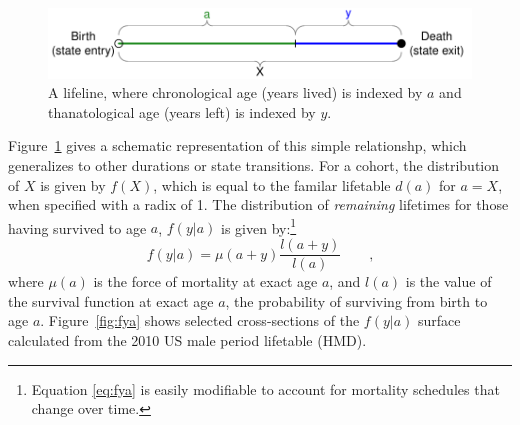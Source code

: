 \documentclass{article}
\newcommand{\tc}{\quad\quad\text{,}}
\begin{document}
\begin{figure}[h]
\centering
	\caption{A lifeline, where chronological age (years lived) is indexed by $a$
	and thanatological age (years left) is indexed by $y$.}
	\label{fig:line}
	\includegraphics[scale=.8]{Figures/LifeLine.pdf}	
\end{figure}
Figure~\ref{fig:line} gives a schematic representation of this simple
relationshp, which generalizes to other durations or state transitions. For a
cohort, the distribution of $X$ is given by $f(X)$, which is equal to the familar lifetable
$d(a)$ for $a = X$, when specified with a radix of 1. The distribution of
\textit{remaining} lifetimes for those having survived to age $a$, $f(y|a)$ is
given by:\footnote{Equation \eqref{eq:fya} is easily modifiable to account for
mortality schedules that change over time.}
\begin{equation}
\label{eq:fya}
f(y|a) = \mu(a+y) \frac{l(a+y)}{l(a)} \tc
\end{equation}
where $\mu(a)$ is the force of mortality at exact age $a$, and $l(a)$ is
the value of the survival function at exact age $a$, the probability of
surviving from birth to age $a$. Figure~\ref{fig:fya} shows selected
cross-sections of the $f(y|a)$ surface calculated from the 2010 US male period lifetable (HMD). 
\end{document}
